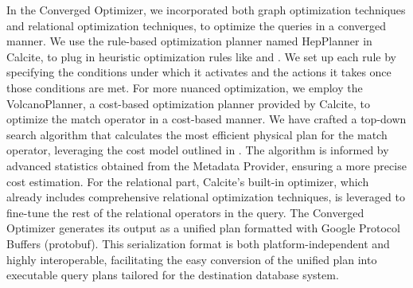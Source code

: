 In the Converged Optimizer,
we incorporated both graph optimization techniques and relational optimization techniques, to optimize the \spjm queries in a converged manner.
We use the rule-based optimization planner named HepPlanner in Calcite, to plug in heuristic optimization rules like \filterrule and \joinfuserule. We set up each rule by specifying the conditions under which it activates and the actions it takes once those conditions are met.
For more nuanced optimization, we employ the VolcanoPlanner, a cost-based optimization planner provided by Calcite, to optimize the match operator in a cost-based manner.
We have crafted a top-down search algorithm that calculates the most efficient physical plan for the match operator, leveraging the cost model outlined in . The algorithm is informed by advanced statistics obtained from the Metadata Provider, ensuring a more precise cost estimation.
For the relational part, Calcite's built-in optimizer, which already includes comprehensive relational optimization techniques, is leveraged to fine-tune the rest of the relational operators in the query.
The Converged Optimizer generates its output as a unified plan formatted with Google Protocol Buffers (protobuf)\cite{protobuf}. This serialization format is both platform-independent and highly interoperable, facilitating the easy conversion of the unified plan into executable query plans tailored for the destination database system.


